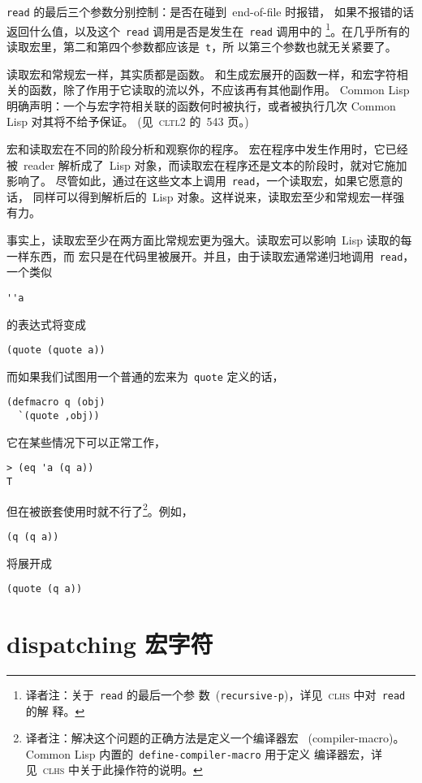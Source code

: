 \texttt{read} 的最后三个参数分别控制：是否在碰到~end-of-file 时报错，
如果不报错的话返回什么值，以及这个~\texttt{read} 调用是否是发生在~\texttt{read} 调用中的
\footnote{译者注：关于~\texttt{read} 的最后一个参
  数~(\texttt{recursive-p})，详见~\textsc{clhs} 中对~\texttt{read} 的解
  释。}。在几乎所有的读取宏里，第二和第四个参数都应该是~\texttt{t}，所
以第三个参数也就无关紧要了。

读取宏和常规宏一样，其实质都是函数。
和生成宏展开的函数一样，和宏字符相关的函数，除了作用于它读取的流以外，不应该再有其他副作用。
Common Lisp 明确声明：一个与宏字符相关联的函数何时被执行，或者被执行几次 \pozhehao{} Common Lisp 对其将不给予保证。
(见~\textsc{cltl}2 的~543 页。)

宏和读取宏在不同的阶段分析和观察你的程序。
宏在程序中发生作用时，它已经被~reader 解析成了~Lisp 对象，而读取宏在程序还是文本的阶段时，就对它施加影响了。
尽管如此，通过在这些文本上调用~\verb|read|，一个读取宏，如果它愿意的话，
同样可以得到解析后的~Lisp 对象。这样说来，读取宏至少和常规宏一样强有力。

事实上，读取宏至少在两方面比常规宏更为强大。读取宏可以影响~Lisp 读取的每一样东西，而
宏只是在代码里被展开。并且，由于读取宏通常递归地调用~\verb|read|，一个类似
\begin{lstlisting}
''a
\end{lstlisting}
的表达式将变成
\begin{lstlisting}
(quote (quote a))
\end{lstlisting}
而如果我们试图用一个普通的宏来为~\verb|quote| 定义\abbrev{}的话，
\begin{lstlisting}
(defmacro q (obj)
  `(quote ,obj))
\end{lstlisting}
它在某些情况下可以正常工作，
\begin{lstlisting}
> (eq 'a (q a))
T
\end{lstlisting}
但在被嵌套使用时就不行了\footnote{译者注：解决这个问题的正确方法是定义一个编译器宏
  ~(compiler-macro)。Common Lisp 内置的~\texttt{define-compiler-macro} 用于定义
  编译器宏，详见~\textsc{clhs} 中关于此操作符的说明。}。例如，
\begin{lstlisting}
(q (q a))
\end{lstlisting}
将展开成
\begin{lstlisting}
(quote (q a))
\end{lstlisting}

\section{dispatching 宏字符}
\label{sec:dispatching_macro_characters}

